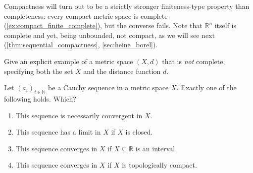 Compactness will turn out to be a strictly stronger finiteness-type property than completeness:
every compact metric space is complete (\cref{ex:compact_finite_complete}), but the converse
fails. Note that $\mathbb{R}^n$ itself is complete and yet, being unbounded, not compact, as we
will see next (\cref{thm:sequential_compactness}, \cref{sec:heine_borel}).


\begin{exercise}
\label{ex:incomplete_metric_space_example}
Give an explicit example of a metric space $(X,d)$ that is \emph{not} complete, specifying both
the set $X$ and the distance function $d$.
\end{exercise}

\begin{exercise}
\label{ex:kobel_cauchy_single_choice}
Let $(a_i)_{i\in\mathbb{N}}$ be a Cauchy sequence in a metric space $X$. Exactly one of the
following holds. Which?
\begin{enumerate}[label=\textbf{(\alph*)}]
  \item This sequence is necessarily convergent in $X$.
  \item This sequence has a limit in $X$ if $X$ is closed.
  \item This sequence converges in $X$ if $X \subseteq \mathbb{R}$ is an interval.
  \item This sequence converges in $X$ if $X$ is topologically compact.
\end{enumerate}
\end{exercise}

